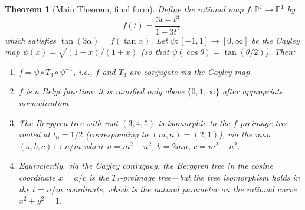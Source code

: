 \documentclass[12pt]{amsart}
\newtheorem{theorem}{Theorem}[section]
\theoremstyle{definition}
\theoremstyle{remark}
\newcommand{\PP}{\mathbb{P}}
\begin{document}
\begin{theorem}[Main Theorem, final form]\label{thm:main-final}
Define the rational map $f\colon\PP^1\to\PP^1$ by
\begin{equation}\label{eq:f-def}
  f(t) = \frac{3t - t^3}{1 - 3t^2},
\end{equation}
which satisfies $\tan(3\alpha) = f(\tan\alpha)$.  Let $\psi\colon[-1,1]
\to[0,\infty]$ be the Cayley map $\psi(x) = \sqrt{(1-x)/(1+x)}$
(so that $\psi(\cos\theta) = \tan(\theta/2)$).  Then:
\begin{enumerate}[label=(\roman*)]
  \item $f = \psi\circ T_3\circ\psi^{-1}$, i.e., $f$ and $T_3$ are
        conjugate via the Cayley map.
  \item $f$ is a Belyi function: it is ramified only above
        $\{0,1,\infty\}$ after appropriate normalization.
  \item The Berggren tree with root $(3,4,5)$ is isomorphic to the
        $f$-preimage tree rooted at $t_0 = 1/2$ (corresponding to
        $(m,n)=(2,1)$), via the map $(a,b,c)\mapsto n/m$ where
        $a=m^2-n^2$, $b=2mn$, $c=m^2+n^2$.
  \item Equivalently, via the Cayley conjugacy, the Berggren tree in the
        cosine coordinate $x=a/c$ is the $T_3$-preimage tree---but the
        tree isomorphism holds in the $t=n/m$ coordinate, which is the
        natural parameter on the rational curve $x^2+y^2=1$.
\end{enumerate}
\end{theorem}
\end{document}
